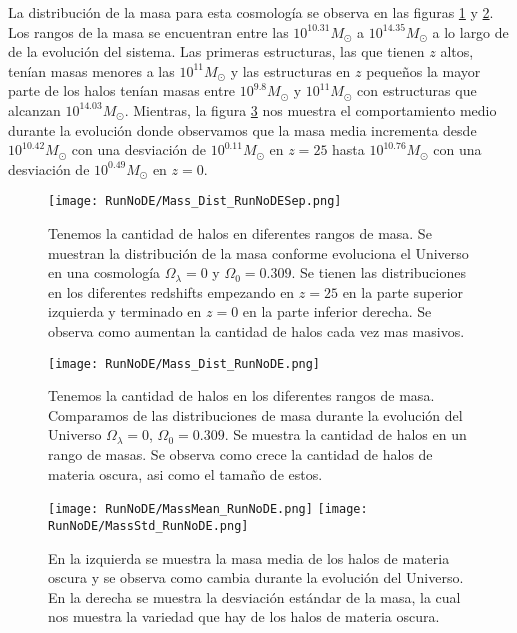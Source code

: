 La distribución de la masa para esta cosmología se observa en las figuras \ref{fig:NoDE-MassDistSep} y \ref{fig:NoDE-MassDist}. Los rangos de la masa se encuentran entre las $10^{10.31}M_\odot$ a $10^{14.35}M_\odot$ a lo largo de de la evolución del sistema. Las primeras estructuras, las que tienen $z$ altos, tenían masas menores a las $10^{11}M_\odot$ y las estructuras en $z$ pequeños la mayor parte de los halos tenían masas entre $10^{9.8}M_\odot$ y $10^{11}M_\odot$ con estructuras que alcanzan $10^{14.03}M_\odot$. Mientras, la figura \ref{fig:NoDE-MassStats} nos muestra el comportamiento medio durante la evolución donde observamos que la masa media incrementa desde $10^{10.42}M_\odot$ con una desviación de $10^{0.11}M_\odot$ en $z=25$ hasta $10^{10.76}M_\odot$ con una desviación de $10^{0.49}M_\odot$ en $z=0$.

\begin{figure}[H]
    \centering
    \texttt{[image: RunNoDE/Mass\_Dist\_RunNoDESep.png]}
    \caption[Distribución de masa]{\footnotesize Tenemos la cantidad de halos en diferentes rangos de masa. Se muestran la distribución de la masa conforme evoluciona el Universo en una cosmología $\Omega_\lambda = 0$ y $\Omega_0 = 0.309$. Se tienen las distribuciones en los diferentes redshifts empezando en $z=25$ en la parte superior izquierda y terminado en $z=0$ en la parte inferior derecha. Se observa como aumentan la cantidad de halos cada vez mas masivos.}
    \label{fig:NoDE-MassDistSep}
\end{figure}

\begin{figure}[H]
    \centering
    \texttt{[image: RunNoDE/Mass\_Dist\_RunNoDE.png]}
    \caption[Comparación de distribución de masa]{\footnotesize Tenemos la cantidad de halos en los diferentes rangos de masa. Comparamos de las distribuciones de masa durante la evolución del Universo $\Omega_\lambda = 0$, $\Omega_0 = 0.309$. Se muestra la cantidad de halos en un rango de masas. Se observa como crece la cantidad de halos de materia oscura, asi como el tamaño de estos.}
    \label{fig:NoDE-MassDist}
\end{figure}

\begin{figure}[H]
    \centering
    \texttt{[image: RunNoDE/MassMean\_RunNoDE.png]}
    \texttt{[image: RunNoDE/MassStd\_RunNoDE.png]}
    \caption[Media y desviación estándar de la distribución de masa]{\footnotesize En la izquierda se muestra la masa media de los halos de materia oscura y se observa como cambia durante la evolución del Universo. En la derecha se muestra la desviación estándar de la masa, la cual nos muestra la variedad que hay de los halos de materia oscura.}
    \label{fig:NoDE-MassStats}
\end{figure}

